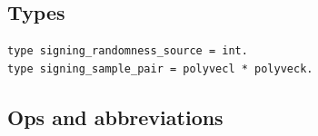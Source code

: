 \section*{}

\subsection*{Types}
\begin{lstlisting}[language=EasyCrypt,basicstyle=\ttfamily\tiny]
type signing_randomness_source = int.
type signing_sample_pair = polyvecl * polyveck.
\end{lstlisting}

\subsection*{Ops and abbreviations}
